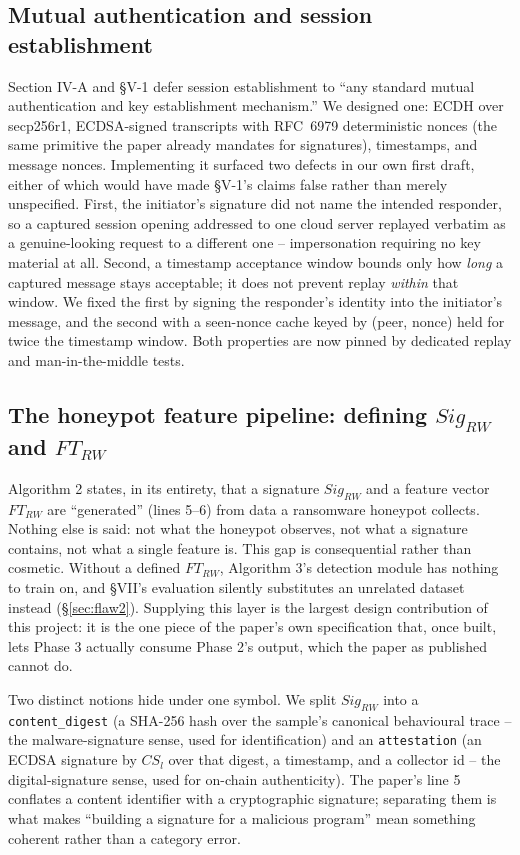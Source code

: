 \documentclass[conference]{IEEEtran}
\begin{document}
\subsection{Mutual authentication and session establishment}

Section IV-A and \S V-1 defer session establishment to ``any standard mutual authentication and
key establishment mechanism.'' We designed one: ECDH over secp256r1, ECDSA-signed transcripts
with RFC~6979 deterministic nonces \cite{rfc6979} (the same primitive the paper already
mandates for signatures), timestamps, and message nonces. Implementing it surfaced two defects
in our own first draft, either of which would have made \S V-1's claims false rather than merely
unspecified. First, the initiator's signature did not name the intended responder, so a captured
session opening addressed to one cloud server replayed verbatim as a genuine-looking request to
a different one -- impersonation requiring no key material at all. Second, a timestamp
acceptance window bounds only how \emph{long} a captured message stays acceptable; it does not
prevent replay \emph{within} that window. We fixed the first by signing the responder's identity
into the initiator's message, and the second with a seen-nonce cache keyed by (peer, nonce) held
for twice the timestamp window. Both properties are now pinned by dedicated replay and
man-in-the-middle tests.

\subsection{The honeypot feature pipeline: defining $Sig_{RW}$ and $FT_{RW}$}
\label{sec:honeypot}

Algorithm 2 states, in its entirety, that a signature $Sig_{RW}$ and a feature vector $FT_{RW}$
are ``generated'' (lines 5--6) from data a ransomware honeypot collects. Nothing else is said:
not what the honeypot observes, not what a signature contains, not what a single feature is.
This gap is consequential rather than cosmetic. Without a defined $FT_{RW}$, Algorithm 3's
detection module has nothing to train on, and \S VII's evaluation silently substitutes an
unrelated dataset instead (\S\ref{sec:flaw2}). Supplying this layer is the largest design
contribution of this project: it is the one piece of the paper's own specification that, once
built, lets Phase 3 actually consume Phase 2's output, which the paper as published cannot do.

Two distinct notions hide under one symbol. We split $Sig_{RW}$ into a \texttt{content\_digest}
(a SHA-256 hash over the sample's canonical behavioural trace -- the malware-signature sense,
used for identification) and an \texttt{attestation} (an ECDSA signature by $CS_l$ over that
digest, a timestamp, and a collector id -- the digital-signature sense, used for on-chain
authenticity). The paper's line 5 conflates a content identifier with a cryptographic signature;
separating them is what makes ``building a signature for a malicious program'' mean something
coherent rather than a category error.
\end{document}
